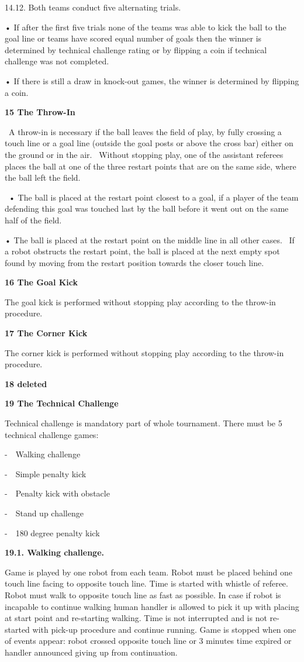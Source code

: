 \documentclass[a4paper]{article}
\begin{document}
14.12. Both teams conduct five alternating trials.

• If after the first five trials none of the teams was able to kick the ball to the goal line or teams have scored equal
number of goals then the winner is determined by technical challenge rating or by flipping a coin if technical
challenge was not completed.

• If there is still a draw in knock-out games, the winner is determined by flipping a coin.

\textbf{15 The Throw-In}

\ A throw-in is necessary if the ball leaves the field of play, by fully crossing a touch line or a goal line (outside
the goal posts or above the cross bar) either on the ground or in the air. \ Without stopping play, one of the
assistant referees places the ball at one of the three restart points that are on the same side, where the ball left
the field.

\ • The ball is placed at the restart point closest to a goal, if a player of the team defending this goal was touched
last by the ball before it went out on the same half of the field. \ 

• The ball is placed at the restart point on the middle line in all other cases. \ If a robot obstructs the restart
point, the ball is placed at the next empty spot found by moving from the restart position towards the closer touch
line.

\textbf{16 The Goal Kick}

The goal kick is performed without stopping play according to the throw-in procedure.

\textbf{17 The Corner Kick}

The corner kick is performed without stopping play according to the throw-in procedure.

\textbf{18 deleted}

\textbf{19 The Technical Challenge}

Technical challenge is mandatory part of whole tournament. There must be 5 technical challenge games:

{}-\ \ Walking challenge

{}-\ \ Simple penalty kick

{}-\ \ Penalty kick with obstacle

{}-\ \ Stand up challenge

{}-\ \ 180 degree penalty kick

\textbf{19.1. Walking challenge.}

Game is played by one robot from each team. Robot must be placed behind one touch line facing to opposite touch line.
Time is started with whistle of referee. Robot must walk to opposite touch line as fast as possible. In case if robot
is incapable to continue walking human handler is allowed to pick it up with placing at start point and re-starting
walking. Time is not interrupted and is not re-started with pick-up procedure and continue running. Game is stopped
when one of events appear: robot crossed opposite touch line or 3 minutes time expired or handler announced giving up
from continuation. 
\end{document}
